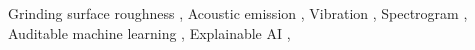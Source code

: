 \begin{keywords}
    Grinding surface roughness \sep
    Acoustic emission \sep
    Vibration \sep
    Spectrogram \sep
    Auditable machine learning \sep
    Explainable AI \sep
\end{keywords}
